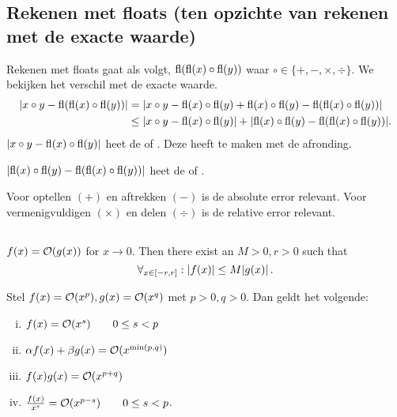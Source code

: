 \documentclass{2wn20summary}
\begin{document}
	\subsection{Rekenen met floats (ten opzichte van rekenen met de exacte waarde)}
		\begin{define}
			Rekenen met floats gaat als volgt, $ \operatorname{\mathop{fl}} (\operatorname{\mathop{fl}} (x) \circ \operatorname{\mathop{fl}} (y)) $ waar $ \circ \in \{+,-,\times, \div\} $. We bekijken het verschil met de exacte waarde. 
			\begin{align*}
				{\left| x \circ y - \operatorname{\mathop{fl}}(\operatorname{\mathop{fl}}(x) \circ \operatorname{\mathop{fl}}(y)) \right|} &= {\left| x \circ y - \operatorname{\mathop{fl}} (x) \circ \operatorname{\mathop{fl}} (y) + \operatorname{\mathop{fl}} (x) \circ \operatorname{\mathop{fl}} (y) - \operatorname{\mathop{fl}} (\operatorname{\mathop{fl}} (x) \circ \operatorname{\mathop{fl}} (y))\right|} \\
				&\leq {\left|x \circ y - \operatorname{\mathop{fl}}(x) \circ \operatorname{\mathop{fl}}(y)\right|} + {\left|\operatorname{\mathop{fl}} (x) \circ \operatorname{\mathop{fl}} (y) - \operatorname{\mathop{fl}} (\operatorname{\mathop{fl}} (x) \circ \operatorname{\mathop{fl}} (y))\right|}.
			\end{align*}
			$ {\left|x \circ y - \operatorname{\mathop{fl}} (x) \circ \operatorname{\mathop{fl}} (y)\right|} $ heet de  of . Deze heeft te maken met de afronding.
			
			$  {\left|\operatorname{\mathop{fl}} (x) \circ \operatorname{\mathop{fl}} (y) - \operatorname{\mathop{fl}} (\operatorname{\mathop{fl}} (x) \circ \operatorname{\mathop{fl}} (y))\right|} $ heet de  of .
		\end{define}
		
		\begin{note}
			Voor optellen $ (+) $ en aftrekken $ (-) $ is de absolute error relevant. Voor vermenigvuldigen $ (\times) $ en delen $ (\div) $ is de relative error relevant.
		\end{note}
		
	\subsection{\indx{Landau orde symbool}}
		\begin{define}
			$ f(x) = \mathcal{O} (g(x)) $ for $ x \to 0 $. Then there exist an $ M > 0, r>0 $ such that
			\[ 
				\forall_{x \in [-r,r]}:{\left|f(x)\right|} \leq M {\left|g(x)\right|}\,.
			\]
		\end{define}
		
		\begin{theorem}
			Stel $ f(x) = \mathcal{O}(x^p), g(x) = \mathcal{O}(x^q) $ met $ p>0, q>0 $. Dan geldt het volgende:
			\begin{enumerate}[(i)]
				\item $ f(x) = \mathcal{O}(x^s) \qquad 0 \leq s < p $
				\item $ \alpha f(x) + \beta g(x) = \mathcal{O} (x^{\min (p,q)}) $
				\item $ f(x)g(x) = \mathcal{O}(x^{p+q}) $
				\item $ \frac{f(x)}{x^s} = \mathcal{O}(x^{p-s}) \qquad 0 \leq s < p $.
			\end{enumerate}
		\end{theorem}
		
\end{document}

